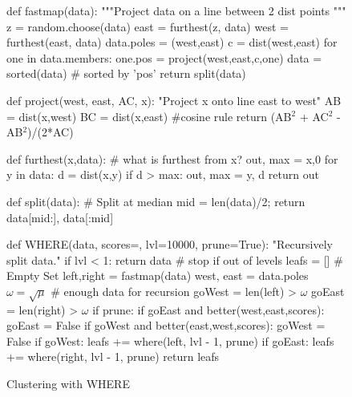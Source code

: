 \documentclass[conference]{IEEEtran}
\begin{document}
\begin{figure}[!b]
\begin{python}[left]
def fastmap(data): 
  """Project data on a line 
     between 2 dist points
  """
  z          = random.choose(data)
  east       = furthest(z, data)
  west       = furthest(east, data)
  data.poles = (west,east)
  c          = dist(west,east)     
  for one in data.members: 
    one.pos = project(west,east,c,one)
  data = sorted(data) # sorted by 'pos'
  return split(data)

def project(west, east, AC, x): 
  "Project x onto line east to west"
  AB = dist(x,west)
  BC = dist(x,east)
  #cosine rule
  return (AB$^2$ + AC$^2$ - AB$^2$)/(2*AC) 

def furthest(x,data): 
  # what is furthest from x?
  out, max = x,0
  for y in data:
    d = dist(x,y)
    if d > max: out, max = y, d
  return out

def split(data): # Split at median
   mid = len(data)/2; 
  return data[mid:], data[:mid]

def WHERE(data, scores={}, 
          lvl=10000, prune=True):  
  "Recursively split data."
  if lvl < 1: 
     return data # stop if out of levels
  leafs      = [] # Empty Set
  left,right = fastmap(data)
  west, east = data.poles
  $\omega=\sqrt{\mu}$ # enough data for recursion
  goWest = len(left) > $\omega$  
  goEast = len(right) > $\omega$ 
  if prune: 
    if goEast and better(west,east,scores): 
       goEast = False 
    if goWest and better(east,west,scores): 
       goWest = False 
  if goWest:  
     leafs += where(left,  lvl - 1, prune)  
  if goEast:  
     leafs += where(right, lvl - 1, prune) 
  return leafs

\end{python}
\caption{Clustering with WHERE}
\label{fig:fastmapCode}   
\end{figure}
\end{document}

